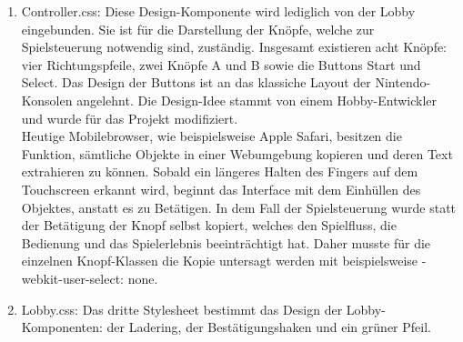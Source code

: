 \documentclass[12pt,a4paper]{article}
\begin{document}
\begin{itemize}
\begin{enumerate}
	\item Controller.css: 
	Diese Design-Komponente wird lediglich von der Lobby eingebunden. Sie ist für die Darstellung der Knöpfe, welche zur Spielsteuerung notwendig sind, zuständig. Insgesamt existieren acht Knöpfe: vier Richtungspfeile, zwei Knöpfe A und B sowie die Buttons Start und Select. Das Design der Buttons ist an das klassiche Layout der Nintendo-Konsolen angelehnt. Die Design-Idee stammt von einem Hobby-Entwickler \cite{Design:buttons} und wurde für das Projekt modifiziert. 
\vspace{1.5ex}\\
Heutige Mobilebrowser, wie beispielsweise Apple Safari, besitzen die Funktion, sämtliche Objekte in einer Webumgebung kopieren und deren Text extrahieren zu können. Sobald ein längeres Halten des Fingers auf dem Touchscreen erkannt wird, beginnt das Interface mit dem Einhüllen des Objektes, anstatt es zu Betätigen. In dem Fall der Spielsteuerung wurde statt der Betätigung der Knopf selbst kopiert, welches den Spielfluss, die Bedienung und das Spielerlebnis beeinträchtigt hat. Daher musste für die einzelnen Knopf-Klassen die Kopie untersagt werden mit beispielsweise \glqq -webkit-user-select: none\grqq{}. 

	\item Lobby.css: 
	Das dritte Stylesheet bestimmt das Design der Lobby-Komponenten: der Ladering, der Bestätigungshaken und ein grüner Pfeil. 
\end{enumerate}


\end{itemize}
\end{document}
